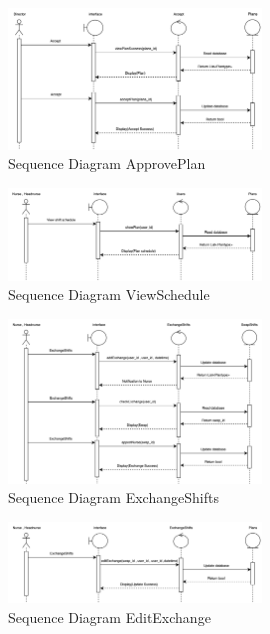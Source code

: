     \begin{figure}
    \centering
    \includegraphics[width=0.6\textwidth]{Sequence 4.4.png}
    \caption{Sequence Diagram ApprovePlan}
    \end{figure}


    \begin{figure}[h]
    \centering
    \includegraphics[width=0.6\textwidth]{Sequence 5.1.png}
    \caption{Sequence Diagram ViewSchedule}
    \end{figure}


    \begin{figure}[h]
    \centering
    \includegraphics[width=0.6\textwidth]{Sequence 6.1.png}
    \caption{Sequence Diagram ExchangeShifts}
    \end{figure}
    
    \begin{figure}[h]
        \centering
        \includegraphics[width=0.6\textwidth]{Sequence 6.2.png}
        \caption{Sequence Diagram EditExchange}
        \end{figure}

